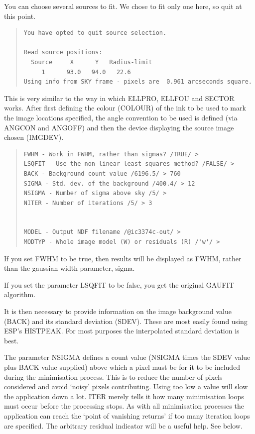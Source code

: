 \documentclass[twoside,11pt]{article}
\newenvironment{myquote}{\begin{quote}\begin{small}}{\end{small}\end{quote}}
\begin{document}
You can choose several sources to fit.  We chose to fit only one here,
so quit at this point.

\begin{myquote}
\begin{verbatim}
You have opted to quit source selection.

Read source positions:
  Source     X      Y   Radius-limit
     1      93.0   94.0   22.6
Using info from SKY frame - pixels are  0.961 arcseconds square.
\end{verbatim}
\end{myquote}

This is very similar to the way in which ELLPRO, ELLFOU and SECTOR works.
After first defining the colour (COLOUR) of the ink to be used to mark the
image locations specified, the angle convention to be used is
defined (via ANGCON and ANGOFF) and then the device displaying the
source image chosen (IMGDEV).


\begin{myquote}
\begin{verbatim}
FWHM - Work in FWHM, rather than sigmas? /TRUE/ >
LSQFIT - Use the non-linear least-squares method? /FALSE/ >
BACK - Background count value /6196.5/ > 760
SIGMA - Std. dev. of the background /400.4/ > 12
NSIGMA - Number of sigma above sky /5/ >
NITER - Number of iterations /5/ > 3


MODEL - Output NDF filename /@ic3374c-out/ >
MODTYP - Whole image model (W) or residuals (R) /'w'/ >
\end{verbatim}
\end{myquote}
If you set FWHM to be
true, then results will be displayed as FWHM, rather than the gaussian
width parameter, sigma.


If you set the parameter LSQFIT to be false, you get the original
GAUFIT algorithm.

It is then necessary to provide information on the image background value
(BACK) and its standard deviation (SDEV). These are most easily found
using ESP's HISTPEAK. For most purposes the interpolated standard deviation is
best.

The parameter NSIGMA defines a count value (NSIGMA times the SDEV value
plus BACK value supplied)
above which a pixel must be
for it to be included during the minimisation process. This is to reduce
the number of pixels considered and avoid `noisy' pixels contributing.
Using too low a value will slow the application down a lot.
ITER merely tells it how many minimisation loops must occur before the
processing stops. As with all minimisation processes the application can
reach the `point of vanishing returns' if too many iteration loops are
specified. The arbitrary residual indicator will be a useful help. See below.
\end{document}
